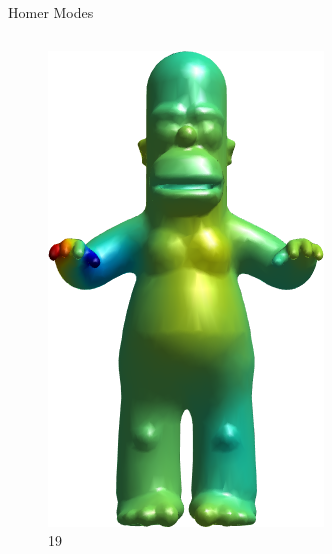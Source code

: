 \documentclass{beamer}
\begin{document}
\begin{frame}{Homer Modes}
\begin{columns}
\begin{column}[T]{3cm}
\begin{figure}[t]
    \includegraphics[width=\textwidth]{Harmonics/HomerModes/19.png}
    \caption*{\huge 19}
\end{figure}
\end{column}
\begin{column}[T]{3cm}
\begin{figure}[t]


\end{figure}
\end{column}
\end{columns}
\end{frame}
\end{document}

